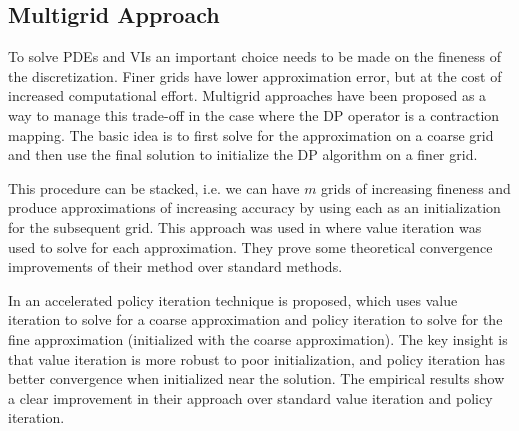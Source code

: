 \subsection{Multigrid Approach}

To solve PDEs and VIs an important choice needs to be made on the fineness of the discretization. Finer grids have lower approximation error, but at the cost of increased computational effort. Multigrid approaches have been proposed as a way to manage this trade-off in the case where the DP operator is a contraction mapping. The basic idea is to first solve for the approximation on a coarse grid and then use the final solution to initialize the DP algorithm on a finer grid. 

This procedure can be stacked, i.e. we can have $m$ grids of increasing fineness and produce approximations of increasing accuracy by using each as an initialization for the subsequent grid.  This approach was used in \cite{Chow1991} where value iteration was used to solve for each approximation. They prove some theoretical convergence improvements of their method over standard methods.

In \cite{Alla2015} an accelerated policy iteration technique is proposed, which uses value iteration to solve for a coarse approximation and policy iteration to solve for the fine approximation (initialized with the coarse approximation). The key insight is that value iteration is more robust to poor initialization, and policy iteration has better convergence when initialized near the solution. The empirical results show a clear improvement in their approach over standard value iteration and policy iteration.
